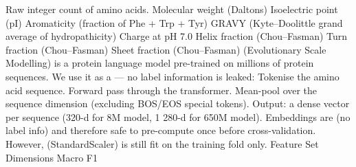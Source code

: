 {} Raw integer count of amino acids.\markdownRendererParagraphSeparator
{}\markdownRendererInterblockSeparator
{}\markdownRendererUlBeginTight
\markdownRendererUlItem Molecular weight (Daltons)\markdownRendererUlItemEnd 
\markdownRendererUlItem Isoelectric point (pI)\markdownRendererUlItemEnd 
\markdownRendererUlItem Aromaticity (fraction of Phe + Trp + Tyr)\markdownRendererUlItemEnd 
\markdownRendererUlItem GRAVY (Kyte–Doolittle grand average of hydropathicity)\markdownRendererUlItemEnd 
\markdownRendererUlItem Charge at pH 7.0\markdownRendererUlItemEnd 
\markdownRendererUlItem Helix fraction (Chou–Fasman)\markdownRendererUlItemEnd 
\markdownRendererUlItem Turn fraction (Chou–Fasman)\markdownRendererUlItemEnd 
\markdownRendererUlItem Sheet fraction (Chou–Fasman)\markdownRendererUlItemEnd 
\markdownRendererUlEndTight \markdownRendererInterblockSeparator
{}
\markdownRendererSectionEnd \markdownRendererSectionBegin
{}\markdownRendererInterblockSeparator
{} (Evolutionary Scale Modelling) is a protein language model pre-trained on millions of\markdownRendererSoftLineBreak
{}protein sequences. We use it as a  — no label information is leaked:\markdownRendererInterblockSeparator
{}\markdownRendererOlBeginTight
{}Tokenise the amino acid sequence.\markdownRendererOlItemEnd 
{}Forward pass through the transformer.\markdownRendererOlItemEnd 
{}Mean-pool over the sequence dimension (excluding BOS/EOS special tokens).\markdownRendererOlItemEnd 
{}Output: a dense vector per sequence (320-d for 8M model, 1 280-d for 650M model).\markdownRendererOlItemEnd 
\markdownRendererOlEndTight \markdownRendererInterblockSeparator
{}Embeddings are  (no label info) and therefore safe to pre-compute once before\markdownRendererSoftLineBreak
{}cross-validation. However,  (StandardScaler) is still fit on the training fold\markdownRendererSoftLineBreak
{}only.\markdownRendererInterblockSeparator
{}
\markdownRendererSectionEnd \markdownRendererSectionBegin
{}\markdownRendererInterblockSeparator
{}\markdownRendererPipe{} Feature Set \markdownRendererPipe{} Dimensions \markdownRendererPipe{} Macro F1 \markdownRendererPipe{}\markdownRendererSoftLineBreak
